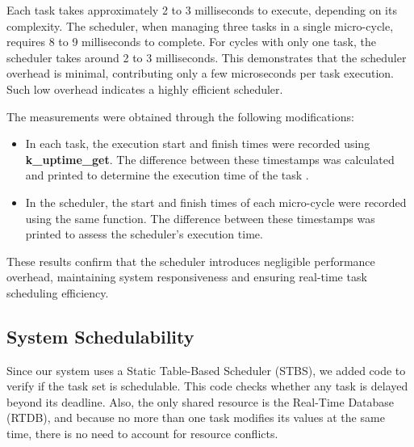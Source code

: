\documentclass[a4paper,12pt]{article}
\begin{document}
Each task takes approximately 2 to 3 milliseconds to execute, depending on its complexity. The scheduler, when managing three tasks in a single micro-cycle, requires 8 to 9 milliseconds to complete. For cycles with only one task, the scheduler takes around 2 to 3 milliseconds. This demonstrates that the scheduler overhead is minimal, contributing only a few microseconds per task execution. Such low overhead indicates a highly efficient scheduler.

The measurements were obtained through the following modifications:
\begin{itemize} 
    \item In each task, the execution start and finish times were recorded using \textbf{k\_uptime\_get}. The difference between these timestamps was calculated and printed to determine the execution time of the task .
    \item In the scheduler, the start and finish times of each micro-cycle were recorded using the same function. The difference between these timestamps was printed to assess the scheduler's execution time.
\end{itemize}

These results confirm that the scheduler introduces negligible performance overhead, maintaining system responsiveness and ensuring real-time task scheduling efficiency.


\subsection{System Schedulability}






Since our system uses a Static Table-Based Scheduler (STBS), we added code to verify if the task set is schedulable. This code checks whether any task is delayed beyond its deadline. Also, the only shared resource is the Real-Time Database (RTDB), and because no more than one task modifies its values at the same time, there is no need to account for resource conflicts.
\end{document}
